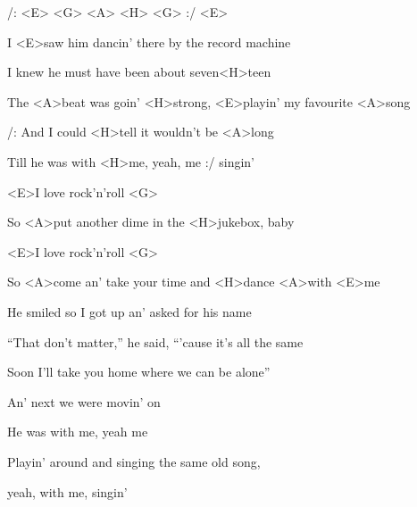 

/: <E> <G> <A> <H> <G> :/ <E>

\zs
I <E>saw him dancin' there by the record machine

I knew he must have been about seven<H>teen

The <A>beat was goin' <H>strong, <E>playin' my favourite <A>song

/: And I could <H>tell it wouldn't be <A>long

Till he was with <H>me, yeah, me :/ singin'
\ks

\zr
<E>I love rock'n'roll <G>

So <A>put another dime in the <H>jukebox, baby

<E>I love rock'n'roll <G>

So <A>come an' take your time and <H>dance <A>with <E>me
\kr

\zs
He smiled so I got up an' asked for his name

``That don't matter,'' he said, ``'cause it's all the same

Soon I'll take you home where we can be alone''

An' next we were movin' on

He was with me, yeah me

Playin' around and singing the same old song,

yeah, with me, singin'
\ks

\zr\kr

\kp
